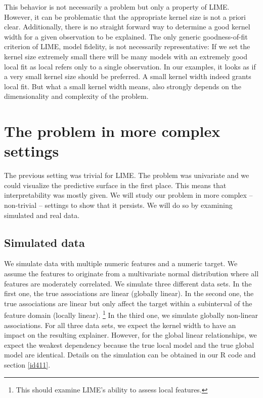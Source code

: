 \documentclass[]{krantz}
\begin{document}
This behavior is not necessarily a problem but only a property of LIME.
However, it can be problematic that the appropriate kernel size is not a
priori clear. Additionally, there is no straight forward way to
determine a good kernel width for a given observation to be explained.
The only generic goodness-of-fit criterion of LIME, model fidelity, is
not necessarily representative: If we set the kernel size extremely
small there will be many models with an extremely good local fit as
local refers only to a single observation. In our examples, it looks as
if a very small kernel size should be preferred. A small kernel width
indeed grants local fit. But what a small kernel width means, also
strongly depends on the dimensionality and complexity of the problem.

\section{The problem in more complex settings}\label{id4}

The previous setting was trivial for LIME. The problem was univariate
and we could visualize the predictive surface in the first place. This
means that interpretability was mostly given. We will study our problem
in more complex -- non-trivial -- settings to show that it persists. We
will do so by examining simulated and real data.

\subsection{Simulated data}\label{id41}

We simulate data with multiple numeric features and a numeric target. We
assume the features to originate from a multivariate normal distribution
where all features are moderately correlated. We simulate three
different data sets. In the first one, the true associations are linear
(globally linear). In the second one, the true associations are linear
but only affect the target within a subinterval of the feature domain
(locally linear). \footnote{This should examine LIME's ability to assess
  local features.} In the third one, we simulate globally non-linear
associations. For all three data sets, we expect the kernel width to
have an impact on the resulting explainer. However, for the global
linear relationships, we expect the weakest dependency because the true
local model and the true global model are identical. Details on the
simulation can be obtained in our R code and section \ref{id411}.
\end{document}
